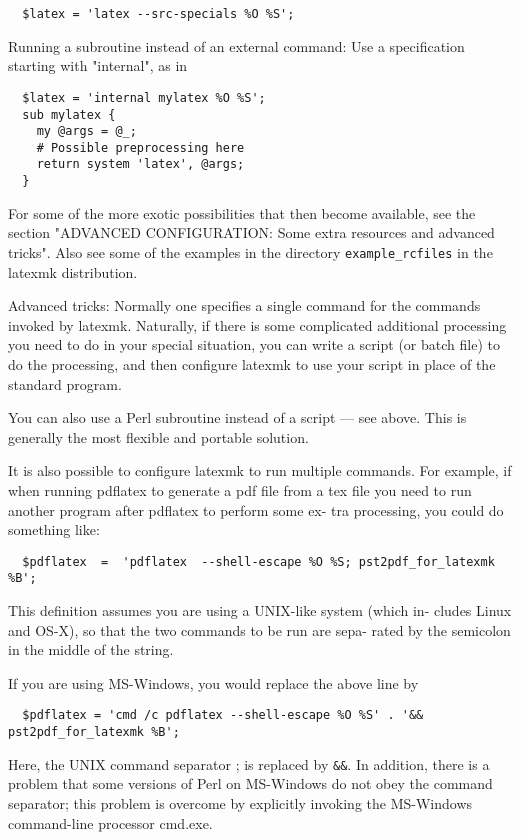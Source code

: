 \begin{verbatim}
  $latex = 'latex --src-specials %O %S';
\end{verbatim}

Running  a  subroutine instead of an external command: Use a specification
starting with "internal", as in

\begin{verbatim}
  $latex = 'internal mylatex %O %S';
  sub mylatex {
    my @args = @_;
    # Possible preprocessing here
    return system 'latex', @args;
  }
\end{verbatim}

For some of the more exotic possibilities that then  become  available, see
the  section "ADVANCED CONFIGURATION: Some extra resources and advanced
tricks". Also see some of the examples in  the  directory  \verb|example_rcfiles| in
the latexmk distribution.

Advanced  tricks:  Normally one specifies a single command for the commands
invoked by latexmk.  Naturally, if there is some complicated  additional
processing  you need to do in your special situation, you can write a script
(or batch file) to do the processing, and then configure latexmk to use your
script in place of the standard program.

You  can  also  use a Perl subroutine instead of a script --- see above.
This is generally the most flexible and portable solution.

It is also possible to configure latexmk to run multiple commands.  For
example,  if  when  running  pdflatex to generate a pdf file from a tex
file you need to run another program after pdflatex to perform some ex-
tra processing, you could do something like:

\begin{verbatim}
  $pdflatex  =  'pdflatex  --shell-escape %O %S; pst2pdf_for_latexmk %B';
\end{verbatim}

This definition assumes you are using a  UNIX-like  system  (which  in-
cludes  Linux  and  OS-X), so that the two commands to be run are sepa-
rated by the semicolon in the middle of the string.

If you are using MS-Windows, you would replace the above line by

\begin{verbatim}
  $pdflatex = 'cmd /c pdflatex --shell-escape %O %S' . '&& pst2pdf_for_latexmk %B';
\end{verbatim}

Here, the UNIX command separator ; is replaced  by  \verb|&&|.   In  addition,
there is a problem that some versions of Perl on MS-Windows do not obey
the command separator; this problem is overcome by explicitly  invoking
the MS-Windows command-line processor cmd.exe.

